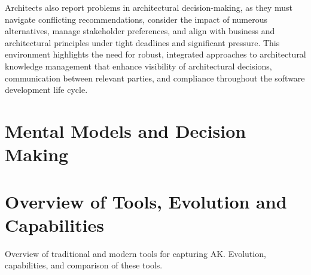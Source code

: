         Architects also report problems in architectural decision-making, as they must navigate conflicting recommendations, consider the impact of numerous alternatives, manage stakeholder preferences, and align with business and architectural principles under tight deadlines and significant pressure. \cite{archtitect_survey} This environment highlights the need for robust, integrated approaches to architectural knowledge management that enhance visibility of architectural decisions, communication between relevant parties, and compliance throughout the software development life cycle.

    \section{Mental Models and Decision Making}
        
    \section{Overview of Tools, Evolution and Capabilities}
        Overview of traditional and modern tools for capturing AK.
        Evolution, capabilities, and comparison of these tools.
